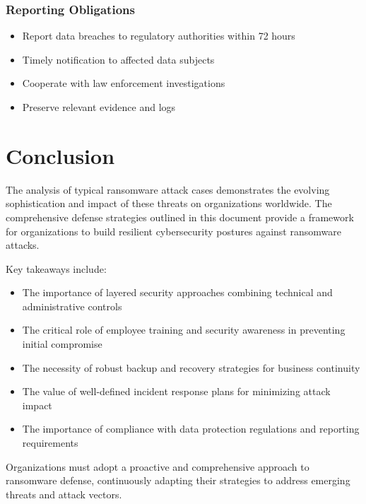 \documentclass[12pt,a4paper]{article}
\begin{document}
\subsubsection{Reporting Obligations}
\begin{itemize}
    \item Report data breaches to regulatory authorities within 72 hours
    \item Timely notification to affected data subjects
    \item Cooperate with law enforcement investigations
    \item Preserve relevant evidence and logs
\end{itemize}

\section{Conclusion}

The analysis of typical ransomware attack cases demonstrates the evolving sophistication and impact of these threats on organizations worldwide. The comprehensive defense strategies outlined in this document provide a framework for organizations to build resilient cybersecurity postures against ransomware attacks.

Key takeaways include:
\begin{itemize}
    \item The importance of layered security approaches combining technical and administrative controls
    \item The critical role of employee training and security awareness in preventing initial compromise
    \item The necessity of robust backup and recovery strategies for business continuity
    \item The value of well-defined incident response plans for minimizing attack impact
    \item The importance of compliance with data protection regulations and reporting requirements
\end{itemize}

Organizations must adopt a proactive and comprehensive approach to ransomware defense, continuously adapting their strategies to address emerging threats and attack vectors.
\end{document}
